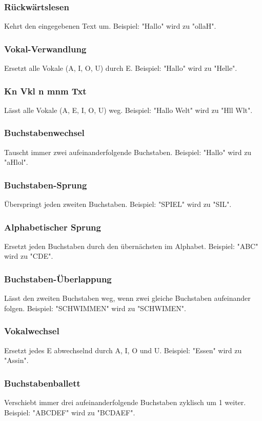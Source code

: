 \documentclass[12pt]{report}
\begin{document}
\subsubsection{Rückwärtslesen}
Kehrt den eingegebenen Text um. Beispiel: "Hallo" wird zu "ollaH".

\subsubsection{Vokal-Verwandlung}
Ersetzt alle Vokale (A, I, O, U) durch E. Beispiel: "Hallo" wird zu "Helle".

\subsubsection{Kn Vkl n mnm Txt}
Lässt alle Vokale (A, E, I, O, U) weg. Beispiel: "Hallo Welt" wird zu "Hll Wlt".

\subsubsection{Buchstabenwechsel}
Tauscht immer zwei aufeinanderfolgende Buchstaben. Beispiel: "Hallo" wird zu "aHlol".

\subsubsection{Buchstaben-Sprung}
Überspringt jeden zweiten Buchstaben. Beispiel: "SPIEL" wird zu "SIL".

\subsubsection{Alphabetischer Sprung}
Ersetzt jeden Buchstaben durch den übernächsten im Alphabet. Beispiel: "ABC" wird zu "CDE".

\subsubsection{Buchstaben-Überlappung}
Lässt den zweiten Buchstaben weg, wenn zwei gleiche Buchstaben aufeinander folgen. Beispiel: "SCHWIMMEN" wird zu "SCHWIMEN".

\subsubsection{Vokalwechsel}
Ersetzt jedes E abwechselnd durch A, I, O und U. Beispiel: "Essen" wird zu "Assin".

\subsubsection{Buchstabenballett}
Verschiebt immer drei aufeinanderfolgende Buchstaben zyklisch um 1 weiter. Beispiel: "ABCDEF" wird zu "BCDAEF".
\end{document}
